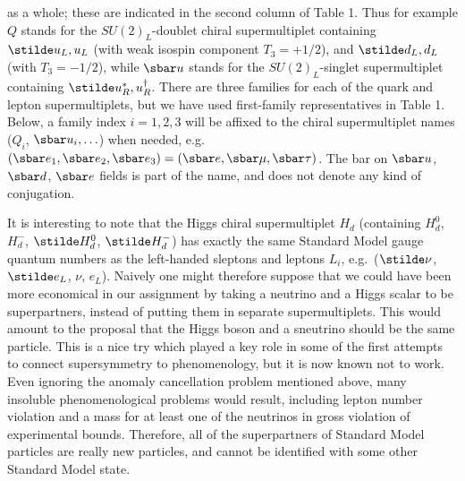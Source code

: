 as a whole; these are indicated in the second column of Table 1. Thus
for example $Q$ stands for the $SU(2)_L$-doublet chiral supermultiplet
containing $\stilde u_L,u_L$ (with weak isospin component $T_3=+1/2$),
and
$\stilde d_L, d_L$ (with $T_3=-1/2$), while $\sbar u$ stands
for the $SU(2)_L$-singlet
supermultiplet containing $\stilde u_R^*,  u_R^\dagger$. There are
three families for each of the quark and lepton supermultiplets, but
we have used first-family representatives in Table 1. Below,
a family index $i=1,2,3$ will be affixed to the chiral supermultiplet names
($Q_i$, $\sbar u_i, \ldots$) when needed, e.g.~$(\sbar e_1, \sbar e_2,
\sbar e_3)= (\sbar e, \sbar \mu, \sbar \tau)$. The bar
on $\sbar u$, $\sbar d$, $\sbar e$ fields is  part of the name, and does
not denote
any kind of conjugation. 

It is interesting to
note that the Higgs chiral supermultiplet $H_d$
(containing $H_d^0$, $H_d^-$, $\stilde H_d^0$, $\stilde H_d^-$)
has exactly the
same Standard Model
gauge quantum numbers as the left-handed sleptons and
leptons $L_i$, e.g.~($\stilde \nu$, $\stilde e_L$, $\nu$, $e_L$).
Naively
one might
therefore suppose that we could have been more economical in our
assignment by taking a neutrino and a Higgs scalar to be superpartners,
instead of putting them in separate supermultiplets.
This would amount to the proposal that the Higgs boson and a sneutrino
should be the same particle. This is a nice try which played a key role
in some of the first attempts to connect supersymmetry to
phenomenology,\cite{FayetHsnu}
but it is now known not to work.
Even ignoring the anomaly cancellation problem mentioned above,
many insoluble phenomenological
problems would result,
including lepton number violation
and a mass for at least one of the neutrinos in gross violation of
experimental bounds. Therefore, all of the superpartners of Standard
Model particles are really new particles, and cannot be identified
with some other Standard Model state.

